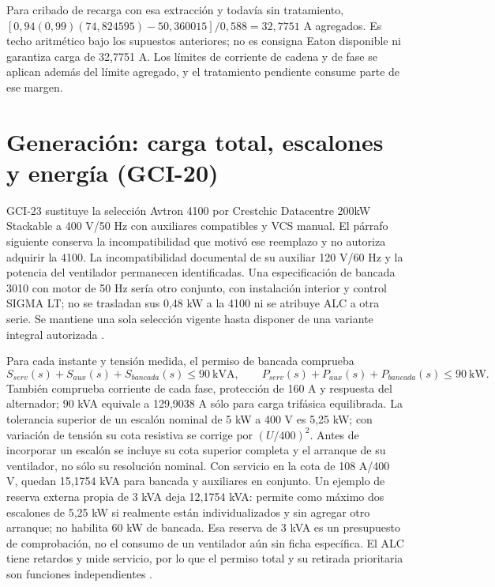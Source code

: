 Para cribado de recarga con esa extracción y todavía sin tratamiento, $[0,94(0,99)(74,824595)-50,360015]/0,588=32,7751$ A agregados. Es techo aritmético bajo los supuestos anteriores; no es consigna Eaton disponible ni garantiza carga de 32,7751 A. Los límites de corriente de cadena y de fase se aplican además del límite agregado, y el tratamiento pendiente consume parte de ese margen.

\section{Generación: carga total, escalones y energía (GCI-20)}
\label{sec:sd4-escalones-gci20}

GCI-23 sustituye la selección Avtron 4100 por Crestchic Datacentre 200kW Stackable a 400 V/50 Hz con auxiliares compatibles y VCS manual. El párrafo siguiente conserva la incompatibilidad que motivó ese reemplazo y no autoriza adquirir la 4100. La incompatibilidad documental de su auxiliar 120 V/60 Hz y la potencia del ventilador permanecen identificadas. Una especificación de bancada 3010 con motor de 50 Hz sería otro conjunto, con instalación interior y control SIGMA LT; no se trasladan sus 0,48 kW a la 4100 ni se atribuye ALC a otra serie. Se mantiene una sola selección vigente hasta disponer de una variante integral autorizada \parencites{lote17-avtron-4100}{lote17-avtron-alc}.

Para cada instante y tensión medida, el permiso de bancada comprueba
\[
S_{serv}(s)+S_{aux}(s)+S_{bancada}(s)\leq90\ \mathrm{kVA},\qquad
P_{serv}(s)+P_{aux}(s)+P_{bancada}(s)\leq90\ \mathrm{kW}.
\]
También comprueba corriente de cada fase, protección de 160 A y respuesta del alternador; $90$ kVA equivale a 129,9038 A sólo para carga trifásica equilibrada. La tolerancia superior de un escalón nominal de 5 kW a 400 V es 5,25 kW; con variación de tensión su cota resistiva se corrige por $(U/400)^2$. Antes de incorporar un escalón se incluye su cota superior completa y el arranque de su ventilador, no sólo su resolución nominal. Con servicio en la cota de 108 A/400 V, quedan 15,1754 kVA para bancada y auxiliares en conjunto. Un ejemplo de reserva externa propia de 3 kVA deja 12,1754 kVA: permite como máximo dos escalones de 5,25 kW si realmente están individualizados y sin agregar otro arranque; no habilita 60 kW de bancada. Esa reserva de 3 kVA es un presupuesto de comprobación, no el consumo de un ventilador aún sin ficha específica. El ALC tiene retardos y mide servicio, por lo que el permiso total y su retirada prioritaria son funciones independientes \parencite{lote17-avtron-alc}.

